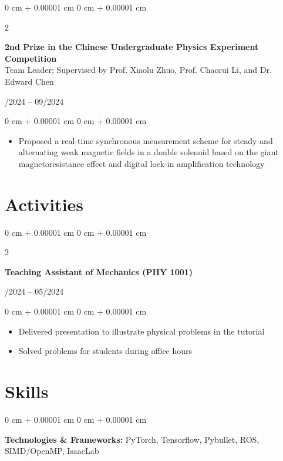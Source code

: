 \documentclass[10pt, letterpaper]{article}
\newenvironment{highlights}{
    \begin{itemize}[
        topsep=0.10 cm,
        parsep=0.10 cm,
        partopsep=0pt,
        itemsep=0pt,
        leftmargin=0 cm + 10pt
    ]
}{
    \end{itemize}
} %
\newenvironment{onecolentry}{
    \begin{adjustwidth}{
        0 cm + 0.00001 cm
    }{
        0 cm + 0.00001 cm
    }
}{
    \end{adjustwidth}
} %
\newenvironment{twocolentry}[2][]{
    \onecolentry
    \def\secondColumn{#2}
    \setcolumnwidth{\fill, 4.5 cm}
    \begin{paracol}{2}
}{
    \switchcolumn \raggedleft \secondColumn
    \end{paracol}
    \endonecolentry
} %
\begin{document}
        \vspace{0.2 cm}

        \begin{twocolentry}{
            07/2024 -- 09/2024
        }
            \textbf{2nd Prize in the Chinese Undergraduate Physics Experiment Competition}\\
            Team Leader; Supervised by Prof. Xiaolu Zhuo, Prof. Chaorui Li, and Dr. Edward Chen
        \end{twocolentry}

        \vspace{0.10 cm}
        \begin{onecolentry}
            \begin{highlights}
                \item Proposed a real-time synchronous measurement scheme for steady and alternating weak magnetic fields in a double solenoid based on the giant magnetoresistance effect and digital lock-in amplification technology
            \end{highlights}
        \end{onecolentry}

    \section{Activities}

        \begin{twocolentry}{
            01/2024 -- 05/2024
        }
            \textbf{Teaching Assistant of Mechanics (PHY 1001)}
        \end{twocolentry}

        \vspace{0.10 cm}
        \begin{onecolentry}
            \begin{highlights}
                \item Delivered presentation to illustrate physical problems in the tutorial
                \item Solved problems for students during office hours
            \end{highlights}
        \end{onecolentry}

    \section{Skills}

        \begin{onecolentry}
            \textbf{Technologies \& Frameworks:} PyTorch, Tensorflow, Pybullet, ROS, SIMD/OpenMP, IsaacLab
        \end{onecolentry}
\end{document}
